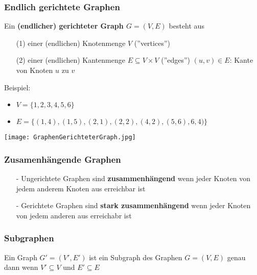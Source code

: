 		\subsubsection{Endlich gerichtete Graphen}
			\begin{minipage}{0.6\textwidth}
				Ein \textbf{(endlicher) gerichteter Graph $G = (V,E)$} besteht aus
				\begin{itemize}
					\item[(1)] einer (endlichen) Knotenmenge $V$ (''vertices'')
					\item[(2)] einer (endlichen) Kantenmenge $ E \subseteq V \times V$ (''edges'') 
							$(u,v) \in E$: Kante von Knoten $u$ zu $v$ \\
				\end{itemize}

				Beispiel: 
				\begin{itemize}
					\item $V = \{1,2,3,4,5,6\}$
					\item $E = \{(1,4),(1,5),(2,1),(2,2),(4,2),(5,6),6,4)\}$
				\end{itemize}
			\end{minipage}
			\hspace{1cm}
			\begin{minipage}{0.35\textwidth}
				\begin{center}
					\texttt{[image: GraphenGerichteterGraph.jpg]}
				\end{center}
			\end{minipage}
			 \vspace{1cm}


		\subsubsection{Zusamenhängende Graphen}
			\begin{itemize}
				\item[-] Ungerichtete Graphen sind \textbf{zusammenhängend} wenn jeder Knoten
					von jedem anderem Knoten aus erreichbar ist
				\item[-] Gerichtete Graphen sind \textbf{stark zusammenhängend} wenn jeder 
					Knoten von jedem anderen aus erreichabr ist
			\end{itemize}
			\vspace{0.6cm}


		\subsubsection{Subgraphen}
			\begin{center}
				Ein Graph $G' = (V', E')$ ist ein Subgraph des Graphen $G = (V, E)$ genau dann
				wenn $V' \subseteq V$ und $E' \subseteq E$
			\end{center}
			\vspace{0.6cm}


